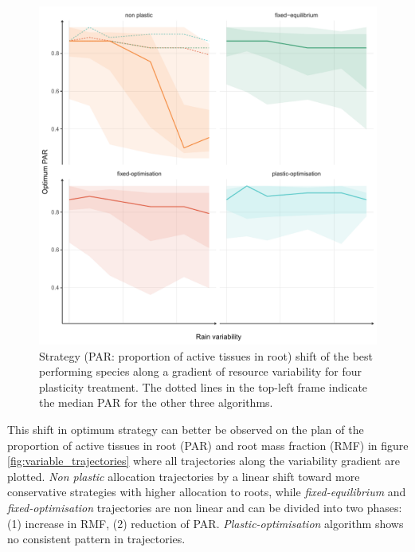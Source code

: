 \begin{figure}\label{fig:variable_strategy}
\includegraphics[width = \textwidth]{./2_PP/Figures/Variable/var_strat_trend.pdf}
\caption[Strategy shift along a gradient of resource variability]{Strategy (PAR: proportion of active tissues in root) shift of the best performing species along a gradient of resource variability for four plasticity treatment. The dotted lines in the top-left frame indicate the median PAR for the other three algorithms.}
\end{figure}

 This shift in optimum strategy can better be observed on the plan of the proportion of active tissues in root (PAR) and root mass fraction (RMF) in figure \ref{fig:variable_trajectories} where all trajectories along the variability gradient are plotted. \textit{Non plastic} allocation trajectories by a linear shift toward more conservative strategies with higher allocation to roots, while \textit{fixed-equilibrium} and \textit{fixed-optimisation} trajectories are non linear and can be divided into two phases: (1) increase in RMF, (2) reduction of PAR. \textit{Plastic-optimisation} algorithm shows no consistent pattern in trajectories.


